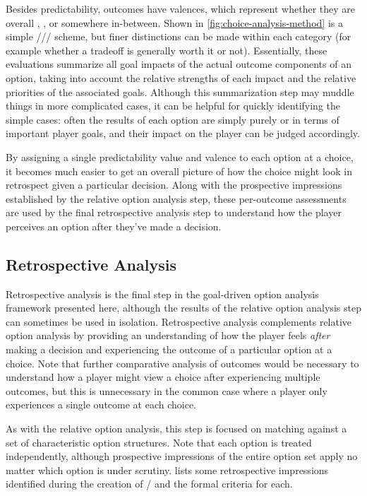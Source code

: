 Besides predictability, outcomes have valences, which represent whether they are overall , , or somewhere in-between.
%
Shown in \cref{fig:choice-analysis-method} is a simple /// scheme, but finer distinctions can be made within each category (for example whether a tradeoff is generally worth it or not).
%
Essentially, these evaluations summarize all goal impacts of the actual outcome components of an option, taking into account the relative strengths of each impact and the relative priorities of the associated goals.
%
Although this summarization step may muddle things in more complicated cases, it can be helpful for quickly identifying the simple cases: often the results of each option are simply purely  or  in terms of important player goals, and their impact on the player can be judged accordingly.


By assigning a single predictability value and valence to each option at a choice, it becomes much easier to get an overall picture of how the choice might look in retrospect given a particular decision.
%
Along with the prospective impressions established by the relative option analysis step, these per-outcome assessments are used by the final retrospective analysis step to understand how the player perceives an option after they've made a decision.


\subsection{Retrospective Analysis}

\label{sec:cp-retrospective-analysis}


Retrospective analysis is the final step in the goal-driven option analysis framework presented here, although the results of the relative option analysis step can sometimes be used in isolation.
%
Retrospective analysis complements relative option analysis by providing an understanding of how the player feels \emph{after} making a decision and experiencing the outcome of a particular option at a choice.
%
Note that further comparative analysis of outcomes would be necessary to understand how a player might view a choice after experiencing multiple outcomes, but this is unnecessary in the common case where a player only experiences a single outcome at each choice.


As with the relative option analysis, this step is focused on matching against a set of characteristic option structures.
%
Note that each option is treated independently, although prospective impressions of the entire option set apply no matter which option is under scrutiny.
%
 lists some retrospective impressions identified during the creation of \dunyazad/ and the formal criteria for each.


